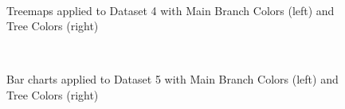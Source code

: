 \documentclass[journal]{vgtc}                %
\begin{document}
\begin{figure}[tb]
  \centering
  \mbox{
  }
  \caption{Treemaps applied to Dataset 4 with Main Branch Colors (left) and Tree Colors (right)}\label{fig:treemapSvy}

\end{figure}



\begin{figure}[tb]
  \centering
  \mbox{
  }
  \caption{Bar charts applied to Dataset 5 with Main Branch Colors (left) and Tree Colors (right)}\label{fig:barSvy}

\end{figure}
\end{document}
